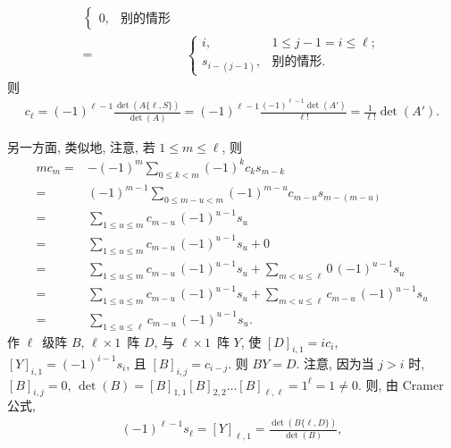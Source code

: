 \documentclass[../libro.tex]{subfiles}
\begin{document}
\begin{example}
\begin{align*}
\begin{cases}
            0,           & \text{别的情形}
        \end{cases}
        \\
        = {} &
        \begin{cases}
            i,           & 1 \leq j-1 = i \leq \ell; \\
            s_{i-(j-1)}, & \text{别的情形}.
        \end{cases}
    \end{align*}
    则
    \begin{align*}
        c_\ell
        = (-1)^{\ell-1}
        \frac{\det {(A\{\ell, S\})}}{\det {(A)}}
        = (-1)^{\ell-1}
        \frac{(-1)^{\ell-1} \det {(A')}}{\ell!}
        = \frac{1}{\ell!} \det {(A')}.
    \end{align*}

    另一方面, 类似地, 注意,
    若 \(1 \leq m \leq \ell\), 则
    \begin{align*}
        m c_m
        = {} &
        {- (-1)^m}
        \sum_{0 \leq k < m} {(-1)^k c_k s_{m-k}}
        \\
        = {} &
        (-1)^{m-1}
        \sum_{0 \leq m-u < m} {(-1)^{m-u} c_{m-u} s_{m-(m-u)}}
        \\
        = {} &
        \sum_{1 \leq u \leq m} {c_{m-u}\, (-1)^{u-1} s_u}
        \\
        = {} &
        \sum_{1 \leq u \leq m} {c_{m-u}\, (-1)^{u-1} s_u}
        + 0
        \\
        = {} &
        \sum_{1 \leq u \leq m} {c_{m-u}\, (-1)^{u-1} s_u}
        + \sum_{m < u \leq \ell} {0\, (-1)^{u-1} s_u}
        \\
        = {} &
        \sum_{1 \leq u \leq m} {c_{m-u}\, (-1)^{u-1} s_u}
        + \sum_{m < u \leq \ell} {c_{m-u}\, (-1)^{u-1} s_u}
        \\
        = {} &
        \sum_{1 \leq u \leq \ell} {c_{m-u}\, (-1)^{u-1} s_u}.
    \end{align*}
    作 \(\ell\)~级阵 \(B\), \(\ell \times 1\)~阵 \(D\),
    与 \(\ell \times 1\)~阵 \(Y\),
    使 \([D]_{i,1} = i c_i\),
    \([Y]_{i,1} = (-1)^{i-1} s_i\),
    且 \([B]_{i,j} = c_{i-j}\).
    则 \(B Y = D\).
    注意, 因为当 \(j > i\) 时,
    \([B]_{i,j} = 0\),
    \(\det {(B)}
        = [B]_{1,1} [B]_{2,2} \dots [B]_{\ell,\ell}
    = 1^\ell = 1 \neq 0\).
    则, 由 Cramer 公式,
    \begin{align*}
        (-1)^{\ell-1} s_\ell
        = [Y]_{\ell,1}
        = \frac{\det {(B\{\ell, D\})}}{\det {(B)}},
    \end{align*}

\end{example}
\end{document}
